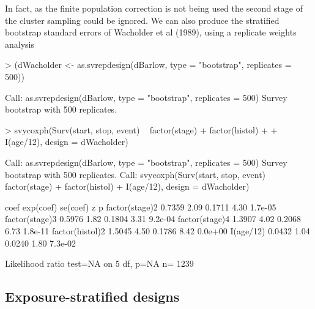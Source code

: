 \documentclass{article}
\begin{document}
In fact, as the finite population correction is not being used the second stage of the cluster sampling could be ignored.   We can also produce the stratified bootstrap standard errors of Wacholder et al (1989), using a replicate weights analysis

\begin{Schunk}
\begin{Sinput}
> (dWacholder <- as.svrepdesign(dBarlow, type = "bootstrap", replicates = 500))
\end{Sinput}
\begin{Soutput}
Call: as.svrepdesign(dBarlow, type = "bootstrap", replicates = 500)
Survey bootstrap with 500 replicates.
\end{Soutput}
\begin{Sinput}
> svycoxph(Surv(start, stop, event) ~ factor(stage) + factor(histol) + 
+     I(age/12), design = dWacholder)
\end{Sinput}
\begin{Soutput}
Call: as.svrepdesign(dBarlow, type = "bootstrap", replicates = 500)
Survey bootstrap with 500 replicates.
Call:
svycoxph(Surv(start, stop, event) ~ factor(stage) + factor(histol) + 
    I(age/12), design = dWacholder)


                  coef exp(coef) se(coef)    z       p
factor(stage)2  0.7359      2.09   0.1711 4.30 1.7e-05
factor(stage)3  0.5976      1.82   0.1804 3.31 9.2e-04
factor(stage)4  1.3907      4.02   0.2068 6.73 1.8e-11
factor(histol)2 1.5045      4.50   0.1786 8.42 0.0e+00
I(age/12)       0.0432      1.04   0.0240 1.80 7.3e-02

Likelihood ratio test=NA  on 5 df, p=NA  n= 1239 
\end{Soutput}
\end{Schunk}


\subsection*{Exposure-stratified designs}
\end{document}
